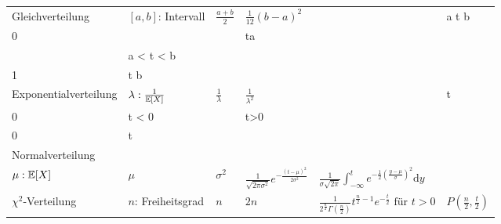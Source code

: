 \begin{center}
\begin{table}
\begin{tabularx}{\textwidth}{llXXXX}
			Gleichverteilung         & \( [a,b] \): Intervall               & \( \frac{a+b}{2} \)              & \( \frac{1}{12}(b-a)^2 \)        & \(\begin{cases} \frac{1}{b-a} &a \le t \le b \\ 0 & \text{sonst}\end{cases}\)                                                                                                                & \(\begin{cases} 0 & t\le a \\ \frac{t-a}{b-a} & a < t < b \\ 1 & t \ge b \end{cases}\)                \\
		
				Exponentialverteilung    & \( \lambda: \frac{1}{\mathbb{E}[X]} \)       & \( \frac{1}{\lambda} \)          & \( \frac{1}{\lambda^2} \)        & \( \begin{cases} \lambda e^{-\lambda t} & t \geq 0 \\ 0 & t < 0 \end{cases} \)                                                                                                              & \( \begin{cases} 1-e^{-\lambda t} & t>0 \\ 0 & t \leq 0\end{cases}\)               \\
		
				Normalverteilung         & \makecell[l]{\( \sigma^2 \): Varianz                                                                                                                                                                                                                                                                       \\ \( \mu: \mathbb{E}[X] \)} & \( \mu \) & \( \sigma ^2 \) & \( \frac{1}{\sqrt{2\pi \sigma^2} }e^{-{\frac{(t-\mu)^2}{2\sigma^2} }} \) & \( \frac{1}{\sigma {\sqrt{2\pi}}} \int_{-\infty}^t e^{-\frac{1}{2}\left( \frac{y-\mu}{\sigma} \right) ^2} \mathrm{d} y \) \\
		
				\( \chi ^2 \)-Verteilung & \( n \): Freiheitsgrad               & \( n \)                          & \( 2n \)                         & \( \frac{1}{2^{\frac{n}{2}}\Gamma (\frac{n}{2})} t^{\frac{n}{2}-1} e^{-\frac{t}{2}} \text{ für } t>0\)                                        & \(P\left( \frac{n}{2}, \frac{t}{2}\right) \) \\
		

\end{tabularx}
\end{table}
\end{center}

